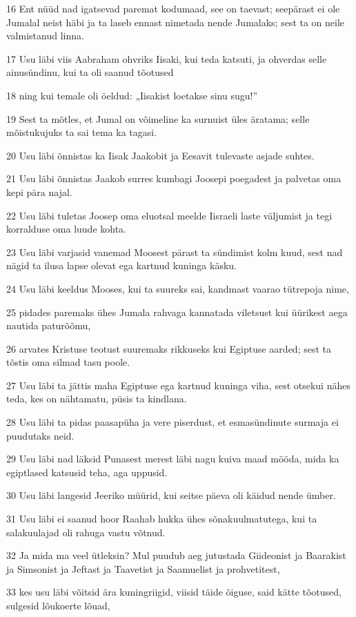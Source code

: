 \par 16 Ent nüüd nad igatsevad paremat kodumaad, see on taevast; seepärast ei ole Jumalal neist häbi ja ta laseb ennast nimetada nende Jumalaks; sest ta on neile valmistanud linna.
\par 17 Usu läbi viis Aabraham ohvriks Iisaki, kui teda katsuti, ja ohverdas selle ainusündinu, kui ta oli saanud tõotused
\par 18 ning kui temale oli öeldud: „Iisakist loetakse sinu sugu!”
\par 19 Sest ta mõtles, et Jumal on võimeline ka surnuist üles äratama; selle mõistukujuks ta sai tema ka tagasi.
\par 20 Usu läbi õnnistas ka Iisak Jaakobit ja Eesavit tulevaste asjade suhtes.
\par 21 Usu läbi õnnistas Jaakob surres kumbagi Joosepi poegadest ja palvetas oma kepi pära najal.
\par 22 Usu läbi tuletas Joosep oma eluotsal meelde Iisraeli laste väljumist ja tegi korralduse oma luude kohta.
\par 23 Usu läbi varjasid vanemad Moosest pärast ta sündimist kolm kuud, sest nad nägid ta ilusa lapse olevat ega kartnud kuninga käsku.
\par 24 Usu läbi keeldus Mooses, kui ta suureks sai, kandmast vaarao tütrepoja nime,
\par 25 pidades paremaks ühes Jumala rahvaga kannatada viletsust kui üürikest aega nautida paturõõmu,
\par 26 arvates Kristuse teotust suuremaks rikkuseks kui Egiptuse aarded; sest ta tõstis oma silmad tasu poole.
\par 27 Usu läbi ta jättis maha Egiptuse ega kartnud kuninga viha, sest otsekui nähes teda, kes on nähtamatu, püsis ta kindlana.
\par 28 Usu läbi ta pidas paasapüha ja vere piserdust, et esmasündinute surmaja ei puudutaks neid.
\par 29 Usu läbi nad läksid Punasest merest läbi nagu kuiva maad mööda, mida ka egiptlased katsusid teha, aga uppusid.
\par 30 Usu läbi langesid Jeeriko müürid, kui seitse päeva oli käidud nende ümber.
\par 31 Usu läbi ei saanud hoor Raahab hukka ühes sõnakuulmatutega, kui ta salakuulajad oli rahuga vastu võtnud.
\par 32 Ja mida ma veel ütleksin? Mul puudub aeg jutustada Giideonist ja Baarakist ja Simsonist ja Jeftast ja Taavetist ja Saamuelist ja prohvetitest,
\par 33 kes usu läbi võitsid ära kuningriigid, viisid täide õiguse, said kätte tõotused, sulgesid lõukoerte lõuad,
